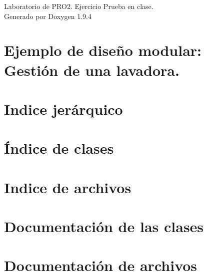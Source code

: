 \documentclass[twoside]{book}
\newcommand{\+}{\discretionary{\mbox{\scriptsize$\hookleftarrow$}}{}{}}
\newcommand{\clearemptydoublepage}{%
    \newpage{\pagestyle{empty}\cleardoublepage}%
  }
\begin{document}
  \raggedbottom
    \hypersetup{pageanchor=false,
                bookmarksnumbered=true,
                pdfencoding=unicode
               }
  \begin{titlepage}
  \vspace*{7cm}
  \begin{center}%
  {\Large Laboratorio de PRO2. Ejercicio Prueba en clase.}\\
  \vspace*{1cm}
  {\large Generado por Doxygen 1.9.4}\\
  \end{center}
  \end{titlepage}
  \clearemptydoublepage
  \tableofcontents
  \clearemptydoublepage
  \hypersetup{pageanchor=true}
\chapter{Ejemplo de diseño modular\+: Gestión de una lavadora.}
\label{index}\hypertarget{index}{}
\chapter{Indice jerárquico}

\chapter{Índice de clases}

\chapter{Indice de archivos}

\chapter{Documentación de las clases}




\chapter{Documentación de archivos}









  \backmatter
  \newpage
  \clearemptydoublepage
  \printindex
\end{document}
